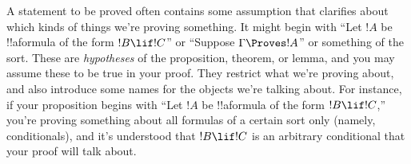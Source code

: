 \documentclass[../../../include/open-logic-section]{subfiles}
\begin{document}
A statement to be proved often contains some assumption that clarifies
about which kinds of things we're proving something. It might begin
with ``Let $!A$ be !!a{formula} of the form $!B \lif !C$'' or
``Suppose $\Gamma \Proves !A$'' or something of the sort.  These are
\emph{hypotheses} of the proposition, theorem, or lemma, and you may
assume these to be true in your proof. They restrict what we're
proving about, and also introduce some names for the objects we're
talking about. For instance, if your proposition begins with ``Let
$!A$ be !!a{formula} of the form $!B \lif !C$,'' you're proving
something about all formulas of a certain sort only (namely,
conditionals), and it's understood that $!B \lif !C$ is an arbitrary
conditional that your proof will talk about.
\end{document}
